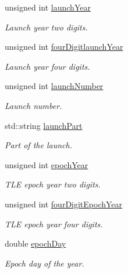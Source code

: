 \begin{DoxyCompactItemize}
unsigned int \hyperlink{structtudat_1_1input__output_1_1TwoLineElementData_aa2a801237c023f174ab3c54840242062}{launch\+Year}
\begin{DoxyCompactList}\small\item\em Launch year two digits. \end{DoxyCompactList}\item 
unsigned int \hyperlink{structtudat_1_1input__output_1_1TwoLineElementData_af37129b7fb27032aca1b5fe5651cc3ae}{four\+Digitlaunch\+Year}
\begin{DoxyCompactList}\small\item\em Launch year four digits. \end{DoxyCompactList}\item 
unsigned int \hyperlink{structtudat_1_1input__output_1_1TwoLineElementData_aaf4fc6cacdec819a406fdbe9397be0cc}{launch\+Number}
\begin{DoxyCompactList}\small\item\em Launch number. \end{DoxyCompactList}\item 
std\+::string \hyperlink{structtudat_1_1input__output_1_1TwoLineElementData_a8d660e8d0f2819cf40f75f76f3a7f41b}{launch\+Part}
\begin{DoxyCompactList}\small\item\em Part of the launch. \end{DoxyCompactList}\item 
unsigned int \hyperlink{structtudat_1_1input__output_1_1TwoLineElementData_ad93bf696554007c87dda49ee3467c3ba}{epoch\+Year}
\begin{DoxyCompactList}\small\item\em T\+LE epoch year two digits. \end{DoxyCompactList}\item 
unsigned int \hyperlink{structtudat_1_1input__output_1_1TwoLineElementData_abfd98150e6d9217eec4cd23fcf99dc8a}{four\+Digit\+Epoch\+Year}
\begin{DoxyCompactList}\small\item\em T\+LE epoch year four digits. \end{DoxyCompactList}\item 
double \hyperlink{structtudat_1_1input__output_1_1TwoLineElementData_ae089e51e2e62cc8c78e5a06ad028a4e2}{epoch\+Day}
\begin{DoxyCompactList}\small\item\em Epoch day of the year. \end{DoxyCompactList}\item 

\end{DoxyCompactItemize}
